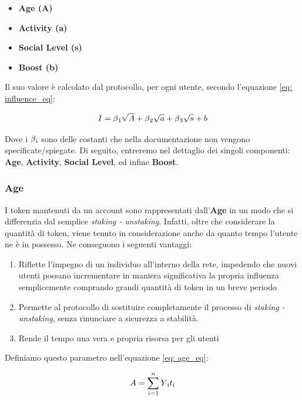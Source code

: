 \begin{itemize}
    \item \textbf{Age (A)}
    \item \textbf{Activity (a)}
    \item \textbf{Social Level (s)}
    \item \textbf{Boost (b)}
\end{itemize}

Il suo valore è calcolato dal protocollo, per ogni utente, secondo l'equazione \ref{eq: influence_eq}:

\begin{equation}\label{eq: influence_eq}
    I = \beta\textsubscript{1}\sqrt{A} + \beta\textsubscript{2}\sqrt{a} + \beta\textsubscript{3}\sqrt{s} + b
\end{equation}

Dove i $\beta\textsubscript{i}$ sono delle costanti che nella documentazione non vengono specificate/spiegate. 
Di seguito, entreremo nel dettaglio dei singoli componenti: \textbf{Age}, \textbf{Activity}, \textbf{Social Level}, ed infine \textbf{Boost}.

\subsubsection{Age}
I token mantenuti da un account sono rappresentati dall'\textbf{Age} in un modo che si differenzia dal semplice \textit{staking - unstaking}. Infatti, oltre che considerare la quantità di token, viene tenuto in considerazione anche da quanto tempo l'utente ne è in possesso. Ne conseguono i seguenti vantaggi:
\begin{enumerate}
    \item Riflette l'impegno di un individuo all'interno della rete, impedendo che nuovi utenti possano incrementare in maniera significativa la propria influenza semplicemente comprando grandi quantità di token in un breve periodo
    \item Permette al protocollo di sostituire completamente il processo di \textit{staking - unstaking}, senza rinunciare a sicurezza a stabilità.
    \item Rende il tempo una vera e propria risorsa per gli utenti
\end{enumerate}

Definiamo questo parametro nell'equazione \ref{eq: age_eq}:

\begin{equation}\label{eq: age_eq}
    A = \sum\limits_{i=1}^nY\textsubscript{i}t\textsubscript{i}
\end{equation}

